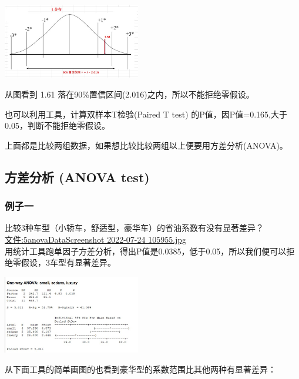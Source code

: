\includegraphics[width=6cm]{CholesterolEg2022-07-23_195121.jpg}

从图看到 1.61 落在90\%置信区间(2.016)之内，所以不能拒绝零假设。

也可以利用工具，计算双样本T检验(Paired T test)
的P值，因P值=0.165,大于0.05，判断不能拒绝零假设。

上面都是比较两组数据，如果想比较比较两组以上便要用方差分析(ANOVA)。

\hypertarget{ux65b9ux5deeux5206ux6790-anova-test}{%
\subsection{方差分析 (ANOVA
test)}\label{ux65b9ux5deeux5206ux6790-anova-test}}

\hypertarget{ux4f8bux5b50ux4e00}{%
\subsubsection{例子一}\label{ux4f8bux5b50ux4e00}}

比较3种车型（小轿车，舒适型，豪华车）的省油系数有没有显著差异？\\
\href{文件:5anovaDataScreenshot_2022-07-24_105955.jpg}{文件:5anovaDataScreenshot
2022-07-24 105955.jpg}\\
用统计工具跑单因子方差分析，得出P值是0.0385，低于0.05，所以我们便可以拒绝零假设，3车型有显著差异。


\includegraphics[width=6cm]{5anovaResultScreenshot_2022-07-24_104352.jpg}

从下面工具的简单画图的也看到豪华型的系数范围比其他两种有显著差异：


